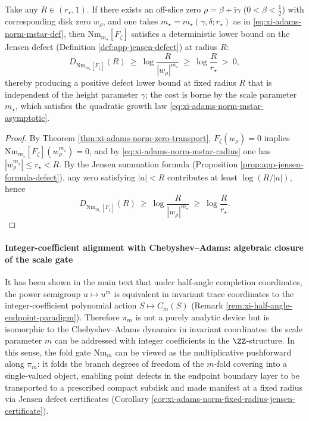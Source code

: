 \begin{corollary}\label{cor:xi-adams-norm-fixed-radius-jensen-certificate}
Take any \(R\in(r_\star,1)\).
If there exists an off-slice zero \(\rho=\beta+\mathrm{i}\gamma\) (\(0<\beta<\tfrac12\)) with corresponding disk zero \(w_\rho\), and one takes \(m_\star=m_\star(\gamma,\delta;r_\star)\) as in \eqref{eq:xi-adams-norm-mstar-def},
then \(\mathrm{Nm}_{m_\star}[F_\zeta]\) satisfies a deterministic lower bound on the Jensen defect (Definition \ref{def:app-jensen-defect}) at radius \(R\):
\[
D_{\mathrm{Nm}_{m_\star}[F_\zeta]}(R)\ \ge\ \log\!\frac{R}{|w_\rho|^{m_\star}}\ \ge\ \log\!\frac{R}{r_\star}\ >\ 0,
\]
thereby producing a positive defect lower bound at fixed radius \(R\) that is independent of the height parameter \(\gamma\); the cost is borne by the scale parameter \(m_\star\), which satisfies the quadratic growth law \eqref{eq:xi-adams-norm-mstar-asymptotic}.
\end{corollary}

\begin{proof}
By Theorem \ref{thm:xi-adams-norm-zero-transport}, \(F_\zeta(w_\rho)=0\) implies \(\mathrm{Nm}_{m_\star}[F_\zeta](w_\rho^{m_\star})=0\), and by \eqref{eq:xi-adams-norm-mstar-radius} one has \(|w_\rho^{m_\star}|\le r_\star<R\).
By the Jensen summation formula (Proposition \ref{prop:app-jensen-formula-defect}), any zero satisfying \(|a|<R\) contributes at least \(\log(R/|a|)\), hence
\[
D_{\mathrm{Nm}_{m_\star}[F_\zeta]}(R)\ \ge\ \log\!\frac{R}{|w_\rho|^{m_\star}}
\ \ge\ \log\!\frac{R}{r_\star}.
\]
\qedhere
\end{proof}

\paragraph{Integer-coefficient alignment with Chebyshev--Adams: algebraic closure of the scale gate}
It has been shown in the main text that under half-angle completion coordinates, the power semigroup \(u\mapsto u^m\) is equivalent in invariant trace coordinates to the integer-coefficient polynomial action \(S\mapsto C_m(S)\) (Remark \ref{rem:xi-half-angle-endpoint-paradigm}).
Therefore \(\pi_m\) is not a purely analytic device but is isomorphic to the Chebyshev--Adams dynamics in invariant coordinates: the scale parameter \(m\) can be addressed with integer coefficients in the \(\ZZ\)-structure.
In this sense, the fold gate \(\mathrm{Nm}_m\) can be viewed as the multiplicative pushforward along \(\pi_m\): it folds the branch degrees of freedom of the \(m\)-fold covering into a single-valued object, enabling point defects in the endpoint boundary layer to be transported to a prescribed compact subdisk and made manifest at a fixed radius via Jensen defect certificates (Corollary \ref{cor:xi-adams-norm-fixed-radius-jensen-certificate}).

